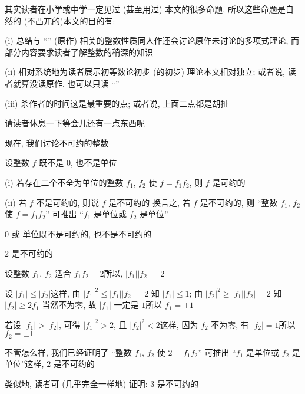 \begin{remark}
    其实读者在小学或中学一定见过 (甚至用过) 本文的很多命题, 所以这些命题是自然的 (不凸兀的)\period 本文的目的有:

    (i) 总结与 ``\HEADING '' (原作) 相关的整数性质\period 同人作还会讨论原作未讨论的多项式理论, 而部分内容要求读者了解整数的稍深的知识\period

    (ii) 相对系统地为读者展示初等数论初步 (的初步) 理论\period 本文相对独立; 或者说, 读者就算没读原作, 也可以只读 ``\SomePropertiesOfIntegers ''\period

    (iii) 杀作者的时间\period 这是最重要的点; 或者说, 上面二点都是胡扯\period

    请读者休息一下\period 等会儿还有一点东西呢\period
\end{remark}

\myLine

现在, 我们讨论不可约的整数\period

\begin{definition}
    设整数 $f$ 既不是 $0$, 也不是单位\period

    (i) 若存在二个不全为单位的整数 $f_1$, $f_2$ 使 $f = f_1 f_2$, 则 $f$ 是可约的 \period

    (ii) 若 $f$ 不是可约的, 则说 $f$ 是不可约的 \period 换言之, 若 $f$ 是不可约的, 则 ``整数 $f_1$, $f_2$ 使 $f = f_1 f_2$'' 可推出 ``$f_1$ 是单位或 $f_2$ 是单位''\period
\end{definition}

\begin{remark}
    $0$ 或 单位既不是可约的, 也不是不可约的\period
\end{remark}

\begin{example}
    $2$ 是不可约的\period

    设整数 $f_1$, $f_2$ 适合 $f_1 f_2 = 2$\period 所以, $|f_1| |f_2| = 2$\period

    设 $|f_1| \leq |f_2|$\period 这样, 由 $|f_1|^2 \leq |f_1| |f_2| = 2$ 知 $|f_1| \leq 1$; 由 $|f_2|^2 \geq |f_1| |f_2| = 2$ 知 $|f_2| \geq 2$\period $f_1$ 当然不为零, 故 $|f_1|$ 一定是 $1$\period 所以 $f_1 = \pm 1$\period

    若设 $|f_1| > |f_2|$, 可得 $|f_1|^2 > 2$, 且 $|f_2|^2 < 2$\period 这样, 因为 $f_2$ 不为零, 有 $|f_2| = 1$\period 所以 $f_2 = \pm 1$\period

    不管怎么样, 我们已经证明了 ``整数 $f_1$, $f_2$ 使 $2 = f_1 f_2$'' 可推出 ``$f_1$ 是单位或 $f_2$ 是单位''\period 这样, $2$ 是不可约的\period

    类似地, 读者可 (几乎完全一样地) 证明: $3$ 是不可约的\period
\end{example}

